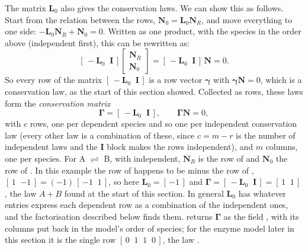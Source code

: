 \documentclass[11pt,a4paper,openany]{report}
\begin{document}
{{The matrix $\mathbf{L}_0$ also gives the conservation laws. We can show this as follows. Start from
the relation between the rows, $\mathbf{N}_0 = \mathbf{L}_0 \mathbf{N}_R$,
and move everything to one side: $-\mathbf{L}_0 \mathbf{N}_R + \mathbf{N}_0
= 0$. Written as one product, with the species in the order above
(independent first), this can be rewritten as:
\[
  [\,-\mathbf{L}_0 \;\; \mathbf{I}\,]
  \begin{bmatrix} \mathbf{N}_R \\ \mathbf{N}_0 \end{bmatrix}
  = [\,-\mathbf{L}_0 \;\; \mathbf{I}\,]\, \mathbf{N} = 0 .
\]
So every row of the matrix $[\,-\mathbf{L}_0 \;\; \mathbf{I}\,]$ is a row
vector $\boldsymbol{\gamma}$ with $\boldsymbol{\gamma} \mathbf{N} = 0$, which
is a conservation law, as the start of this section showed. Collected as
rows, these laws form the \emph{conservation matrix}
\[
  \mathbf{\Gamma} = [\,-\mathbf{L}_0 \;\; \mathbf{I}\,] ,
  \qquad \mathbf{\Gamma} \mathbf{N} = 0 ,
\]
with $c$ rows, one per dependent species and so one per independent
conservation law (every other law is a combination of these, since $c = m -
r$ is the number of independent laws and the $\mathbf{I}$ block makes the
rows independent), and $m$ columns, one per species. For
A $\rightleftharpoons$ B, with  independent, $\mathbf{N}_R$ is the
row of  and $\mathbf{N}_0$ the row of . In this example the
row of  happens to be minus the row of ,
$[\,1 \;\; {-1}\,] = (-1)\,[\,{-1} \;\; 1\,]$, so here $\mathbf{L}_0 =
[\,{-1}\,]$ and
$\mathbf{\Gamma} = [\,-\mathbf{L}_0 \;\; \mathbf{I}\,] = [\,1 \;\; 1\,]$,
the law $A + B$ found at the start of this section. In general
$\mathbf{L}_0$ has whatever entries express each dependent row as a
combination of the independent ones, and the factorisation described below
finds them. 
returns $\mathbf{\Gamma}$ as the field , with its columns put back
in the model's order of species; for the enzyme model later in this section
it is the single row $[\,0 \;\; 1 \;\; 1 \;\; 0\,]$, the law .

}}
\end{document}
